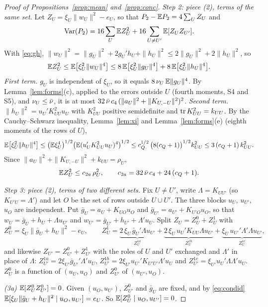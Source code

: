 \begin{proof}[Proof of Propositions~\ref{prop:mean} and~\ref{prop:conc}]
\medskip\noindent\emph{Step 2: piece (2), terms of the same set.} Let $Z_U=\xi_U\|w_U\|^2-e_U$, so that
$P_2-\mathbb{E} P_2=4\sum_UZ_U$ and
\begin{equation}\label{eq:S2}
\operatorname{Var}(P_2)=16\sum_U\mathbb{E} Z_U^2+16\sum_{U\ne U'}\mathbb{E}[Z_UZ_{U'}] .
\end{equation}
With \eqref{eq:gh}, $\|w_U\|^2=\|g_U\|^2+2g_U'h_U+\|h_U\|^2\le2\|g_U\|^2+2\|h_U\|^2$, so
\[
\mathbb{E} Z_U^2\le\mathbb{E}\big[\xi_U^2\|w_U\|^4\big]\le8\,\mathbb{E}\big[\xi_U^2\|g_U\|^4\big]+8\,\mathbb{E}\big[\xi_U^2\|h_U\|^4\big].
\]
\emph{First term.} $g_U$ is independent of $\xi_U$, so it equals $8\,\nu_U\,\mathbb{E}\|g_U\|^4$. By
Lemma~\ref{lem:forms}(c), applied to the errors outside $U$ (fourth moments, S4 and S5), and
$\nu_U\le\bar\nu$, it is at most $32\,\bar\nu\,c_4\,(\|a_U\|^2+\|K_{U,-U}\|^2)^2$.
\emph{Second term.} $\|h_U\|^2=u_U'K_{UU}^2u_U$ with $K_{UU}^2$ positive semidefinite and
$\operatorname{tr} K_{UU}^2=k_{UU}$. By the Cauchy--Schwarz inequality, Lemma~\ref{lem:xi} and
Lemma~\ref{lem:forms}(e) (eighth moments of the rows of $U$),
\[
\mathbb{E}\big[\xi_U^2\|h_U\|^4\big]\le\big(\mathbb{E}\xi_U^4\big)^{1/2}\big(\mathbb{E}(u_U'K_{UU}^2u_U)^4\big)^{1/2}
\le c_Q^{1/2}\,\big(8(c_Q+1)\big)^{1/2}k_{UU}^2\le3\,(c_Q+1)\,k_{UU}^2 .
\]
Since $\|a_U\|^2+\|K_{U,-U}\|^2+k_{UU}=\rho_U$,
\begin{equation}\label{eq:within}
\mathbb{E} Z_U^2\le c_{2a}\,\rho_U^2,\qquad c_{2a}=32\,\bar\nu\,c_4+24\,(c_Q+1) .
\end{equation}

\medskip\noindent\emph{Step 3: piece (2), terms of two different sets.} Fix $U\ne U'$, write
$\Lambda=K_{UU'}$ (so $K_{U'U}=\Lambda'$) and let $O$ be the set of rows outside $U\cup U'$. The three blocks
$u_U$, $u_{U'}$, $u_O$ are independent. Put $\bar g_U=a_U+K_{UO}u_O$ and
$\bar g_{U'}=a_{U'}+K_{U'O}u_O$, so that
$w_U=\bar g_U+h_U+\Lambda u_{U'}$ and $w_{U'}=\bar g_{U'}+h_{U'}+\Lambda'u_U$. Split $Z_U=Z_U^0+Z_U^1$ with
\[
Z_U^0=\xi_U\|\bar g_U+h_U\|^2-e_U,\qquad
Z_U^1=\underbrace{2\,\xi_U\,\bar g_U'\Lambda u_{U'}}_{Z_U^{1a}}+\underbrace{2\,\xi_U\,u_U'K_{UU}\Lambda u_{U'}}_{Z_U^{1b}}
+\underbrace{\xi_U\,u_{U'}'\Lambda'\Lambda u_{U'}}_{Z_U^{1c}},
\]
and likewise $Z_{U'}=Z_{U'}^0+Z_{U'}^1$ with the roles of $U$ and $U'$ exchanged and $\Lambda'$ in place of
$\Lambda$: $Z_{U'}^{1a}=2\xi_{U'}\bar g_{U'}'\Lambda'u_U$, $Z_{U'}^{1b}=2\xi_{U'}u_{U'}'K_{U'U'}\Lambda'u_U$ and
$Z_{U'}^{1c}=\xi_{U'}u_U'\Lambda\Lambda'u_U$.
$Z_U^0$ is a function of $(u_U,u_O)$ and $Z_{U'}^0$ of $(u_{U'},u_O)$.

\emph{(3a) $\mathbb{E}[Z_U^0Z_{U'}^0]=0$.} Given $(u_O,u_{U'})$, $Z_{U'}^0$ and $\bar g_U$ are fixed, and by
\eqref{eq:condid} $\mathbb{E}[\xi_U\|\bar g_U+h_U\|^2\mid u_O,u_{U'}]=e_U$. So
$\mathbb{E}[Z_U^0\mid u_O,u_{U'}]=0$.


\end{proof}
